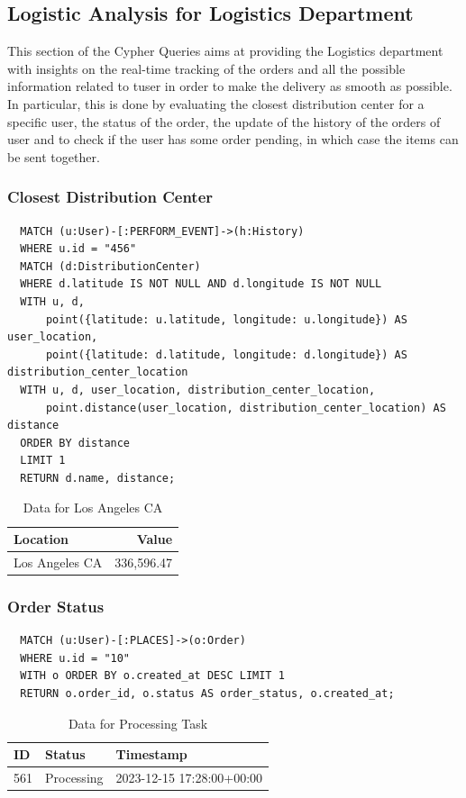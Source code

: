 \documentclass[a4paper,12pt]{article}
\begin{document}
\subsection{Logistic Analysis for Logistics Department}
This section of the Cypher Queries aims at providing the Logistics department with insights on the real-time tracking of the orders and all the possible information related to tuser in order to make the delivery as smooth as possible.
In particular, this is done by evaluating the closest distribution center for a specific user, the status of the order, the update of the history of the orders of user and to check if the user has some order pending, in which case the items can be sent together. 

\subsubsection{Closest Distribution Center}
\begin{verbatim}
  MATCH (u:User)-[:PERFORM_EVENT]->(h:History)
  WHERE u.id = "456"
  MATCH (d:DistributionCenter)
  WHERE d.latitude IS NOT NULL AND d.longitude IS NOT NULL
  WITH u, d, 
      point({latitude: u.latitude, longitude: u.longitude}) AS user_location, 
      point({latitude: d.latitude, longitude: d.longitude}) AS distribution_center_location
  WITH u, d, user_location, distribution_center_location, 
      point.distance(user_location, distribution_center_location) AS distance
  ORDER BY distance
  LIMIT 1
  RETURN d.name, distance;
\end{verbatim}

\begin{table}[h!]
  \centering
  \caption{Data for Los Angeles CA}
  \label{tab:los_angeles_data}
  \begin{tabular}{l r}
      \toprule
      \textbf{Location} & \textbf{Value} \\
      \midrule
      Los Angeles CA & 336,596.47 \\
      \bottomrule
  \end{tabular}
\end{table}

\subsubsection{Order Status}
\begin{verbatim}
  MATCH (u:User)-[:PLACES]->(o:Order)
  WHERE u.id = "10"
  WITH o ORDER BY o.created_at DESC LIMIT 1
  RETURN o.order_id, o.status AS order_status, o.created_at;
\end{verbatim}
\begin{table}[h!]
  \centering
  \caption{Data for Processing Task}
  \label{tab:processing_data}
  \begin{tabular}{l l l}
      \toprule
      \textbf{ID} & \textbf{Status} & \textbf{Timestamp} \\
      \midrule
      561 & Processing & 2023-12-15 17:28:00+00:00 \\
      \bottomrule
  \end{tabular}
\end{table}
\end{document}
